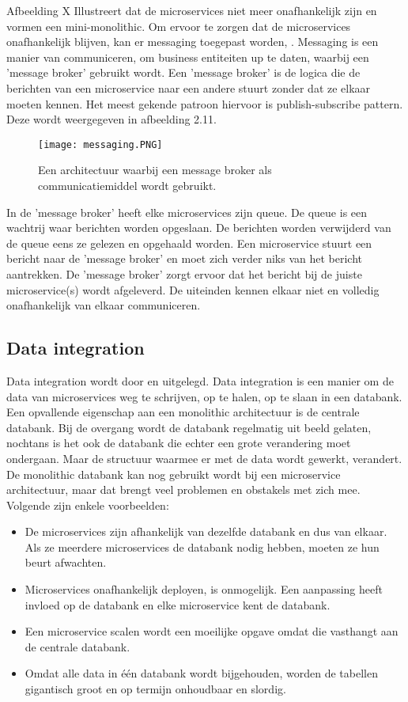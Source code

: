 Afbeelding X Illustreert dat de microservices niet meer onafhankelijk zijn en vormen een mini-monolithic. Om ervoor te zorgen dat de microservices onafhankelijk blijven, kan er messaging toegepast worden, \textcite{Solance2018}. Messaging is een manier van communiceren, om business entiteiten up te daten, waarbij een 'message broker' gebruikt wordt. Een 'message broker' is de logica die de berichten van een microservice naar een andere stuurt zonder dat ze elkaar moeten kennen. Het meest gekende patroon hiervoor is publish-subscribe pattern. Deze wordt weergegeven in afbeelding 2.11.
\begin{figure}[h!]
	\texttt{[image: messaging.PNG]}
	\centering
	\caption{Een architectuur waarbij een message broker als communicatiemiddel wordt gebruikt.}
\end{figure}
In de 'message broker' heeft elke microservices zijn queue. De queue is een wachtrij waar berichten worden opgeslaan. De berichten worden verwijderd van de queue eens ze gelezen en opgehaald worden. 
Een microservice stuurt een bericht naar de 'message broker' en moet zich verder niks van het bericht aantrekken. De 'message broker' zorgt ervoor dat het bericht bij de juiste microservice(s) wordt afgeleverd. De uiteinden kennen elkaar niet en volledig onafhankelijk van elkaar communiceren.

\subsection{Data integration}
Data integration wordt door \textcite{Aradhye2018} en \textcite{Kumar2018} uitgelegd. Data integration is een manier om de data van microservices weg te schrijven, op te halen, op te slaan in een databank.
Een opvallende eigenschap aan een monolithic architectuur is de centrale databank. Bij de overgang wordt de databank regelmatig uit beeld gelaten, nochtans is het ook de databank die echter een grote verandering moet ondergaan. Maar de structuur waarmee er met de data wordt gewerkt, verandert. 
De monolithic databank kan nog gebruikt wordt bij een microservice architectuur, maar  dat brengt veel problemen en obstakels met zich mee. Volgende zijn enkele voorbeelden:
\begin{itemize}
	\item De microservices zijn afhankelijk van dezelfde databank en dus van elkaar. Als ze meerdere microservices de databank nodig hebben, moeten ze hun beurt afwachten.
	\item Microservices onafhankelijk deployen, is onmogelijk. Een aanpassing heeft invloed op de databank en elke microservice kent de databank. 
	\item Een microservice scalen wordt een moeilijke opgave omdat die vasthangt aan de centrale databank. 
	\item Omdat alle data in één databank wordt bijgehouden, worden de tabellen gigantisch groot en op termijn onhoudbaar en slordig. 
\end{itemize}

